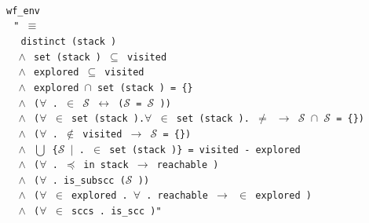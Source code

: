 \documentclass[a4 paper, 12pt]{article}
\newcommand{\where}{{\color{isa_green}{where}}}
\newcommand{\isa}[1]{\small\texttt{\\\noindent#1}}
\newcommand{\blue}[1]{{\color{isa_dark_blue}{#1}}}
\newcommand{\bblue}[1]{{\color{isa_blue}{#1}}}
\newcommand{\green}[1]{{\color{isa_dark_green}{#1}}}
\theoremstyle{definition}
\begin{document}
{\isa{
    \bblue{definition} wf\_env \where{}\\
    $~~~$"\blue{wf\_env} \green{e} $\equiv$\\
    $~~~~~~$distinct (stack \green{e})\\
    $~~~~\wedge$ set (stack \green{e}) $\subseteq$ visited \green{e}\\
    $~~~~\wedge$ explored \green{e} $\subseteq$ visited \green{e}\\
    $~~~~\wedge$ explored \green{e} $\cap$ set (stack \green{e}) = \{\}\\
    $~~~~\wedge$ ($\forall$ \green{v} \green{w}. \green{w} $\in$ $\mathcal{S}$ \green{e} \green{v} $\longleftrightarrow$ ($\mathcal{S}$ \green{e} \green{v} = $\mathcal{S}$ \green{e} \green{w}))\\
    $~~~~\wedge$ ($\forall$\green{v} $\in$ set (stack \green{e}).$\forall$ \green{w} $\in$ set (stack \green{e}).\green{v} $\neq$ \green{w} $\longrightarrow$ $\mathcal{S}$ \green{e} \green{v} $\cap$ $\mathcal{S}$ \green{e} \green{w} = \{\})\\
    $~~~~\wedge$ ($\forall$ \green{v}. \green{v} $\notin$ visited \green{e} $\longrightarrow$ $\mathcal{S}$ \green{e} \green{v} = \{\green{v}\})\\
    $~~~~\wedge$ $\bigcup$ \{$\mathcal{S}$ \green{e} \green{v} $|$ \green{v}. \green{v} $\in$ set (stack \green{e})\} = visited \green{e} - explored \green{e}\\
    $~~~~\wedge$ ($\forall$ \green{x} \green{y}. \green{x} $\preceq$ \green{y} in stack \green{e} $\longrightarrow$ reachable \green{y} \green{x})\\
    $~~~~\wedge$ ($\forall$ \green{x}. is\_subscc ($\mathcal{S}$ \green{e} \green{x}))\\
    $~~~~\wedge$ ($\forall$ \green{x} $\in$ explored \green{e}. $\forall$ \green{y}. reachable \green{x} \green{y} $\longrightarrow$ \green{y} $\in$ explored \green{e})\\
    $~~~~\wedge$ ($\forall$ \green{S} $\in$ sccs \green{e}. is\_scc \green{S})"
}

\BlankLine
\BlankLine

}
\end{document}
